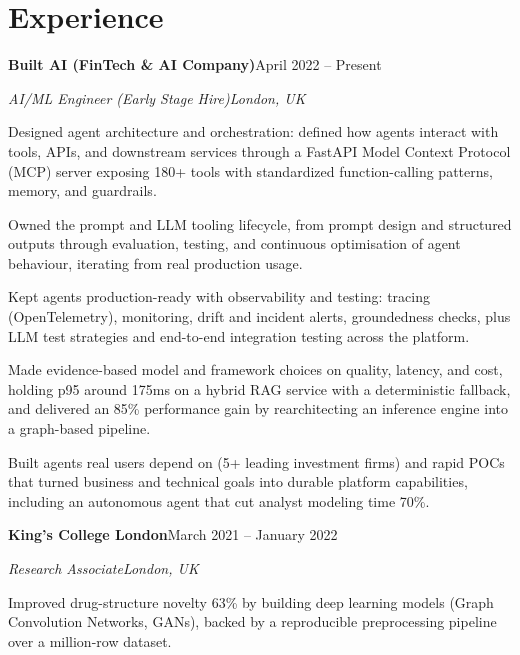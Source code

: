 \documentclass[10pt,a4paper]{article}
\newcommand{\entry}[4]{%
  {\color{company}\bfseries #1}\hfill {\color{muted}#2}\par
  \vspace{1pt}
  {\itshape #3}\hfill {\color{muted}\itshape #4}\par
  \vspace{3pt}%
}
\begin{document}
\section{Experience}
\entry{Built AI (FinTech \& AI Company)}{April 2022 -- Present}{AI/ML Engineer (Early Stage Hire)}{London, UK}
\begin{tight}
  \item Designed agent architecture and orchestration: defined how agents interact with tools, APIs, and downstream services through a FastAPI Model Context Protocol (MCP) server exposing 180+ tools with standardized function-calling patterns, memory, and guardrails.
  \item Owned the prompt and LLM tooling lifecycle, from prompt design and structured outputs through evaluation, testing, and continuous optimisation of agent behaviour, iterating from real production usage.
  \item Kept agents production-ready with observability and testing: tracing (OpenTelemetry), monitoring, drift and incident alerts, groundedness checks, plus LLM test strategies and end-to-end integration testing across the platform.
  \item Made evidence-based model and framework choices on quality, latency, and cost, holding p95 around 175ms on a hybrid RAG service with a deterministic fallback, and delivered an 85\% performance gain by rearchitecting an inference engine into a graph-based pipeline.
  \item Built agents real users depend on (5+ leading investment firms) and rapid POCs that turned business and technical goals into durable platform capabilities, including an autonomous agent that cut analyst modeling time 70\%.
\end{tight}

\entry{King's College London}{March 2021 -- January 2022}{Research Associate}{London, UK}
\begin{tight}
  \item Improved drug-structure novelty 63\% by building deep learning models (Graph Convolution Networks, GANs), backed by a reproducible preprocessing pipeline over a million-row dataset.
\end{tight}

\end{document}
